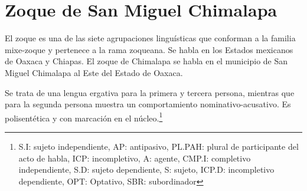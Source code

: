 \section*{Zoque de San Miguel Chimalapa}

\noindent El zoque es una de las siete agrupaciones linguísticas que conforman a la familia mixe-zoque y pertenece a la rama zoqueana. Se habla en los Estados mexicanos de Oaxaca y Chiapas. El zoque de Chimalapa se habla en el municipio de San Miguel Chimalapa al Este del Estado de Oaxaca.

Se trata de una lengua ergativa para la primera y tercera persona, mientras que para la segunda persona muestra un comportamiento nominativo-acusativo. Es polisentética y con marcación en el núcleo.\footnote{S.I: sujeto independiente, AP: antipasivo, PL.PAH: plural de participante del acto de habla, ICP: incompletivo, A: agente, CMP.I: completivo independiente, S.D: sujeto dependiente, S: sujeto, ICP.D: incompletivo dependiente, OPT: Optativo, SBR: subordinador}  \vspace{0.5cm}

